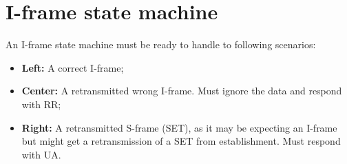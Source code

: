 \documentclass[a4paper, 11pt]{report}
\begin{document}
\newpage
\section{I-frame state machine}

An I-frame state machine must be ready to handle to following scenarios:
\begin{itemize}
	\item \textbf{Left:} A correct I-frame;
	\item \textbf{Center:} A retransmitted wrong I-frame. Must ignore the data and respond with RR;
	\item \textbf{Right:} A retransmitted S-frame (SET), as it may be expecting an I-frame but might get a retransmission of a SET from establishment. Must respond with UA.
\end{itemize}
\end{document}
